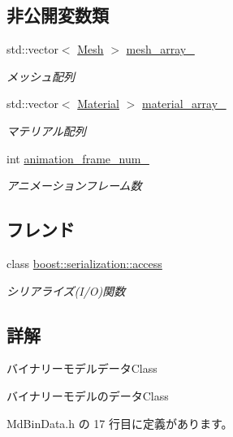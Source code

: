 \subsection*{非公開変数類}
\begin{DoxyCompactItemize}
\item 
std\+::vector$<$ \mbox{\hyperlink{class_md_bin_data_1_1_mesh}{Mesh}} $>$ \mbox{\hyperlink{class_md_bin_data_aefce3cdcd6dcdf388c936ade62c6b9fa}{mesh\+\_\+array\+\_\+}}
\begin{DoxyCompactList}\small\item\em メッシュ配列 \end{DoxyCompactList}\item 
std\+::vector$<$ \mbox{\hyperlink{class_md_bin_data_1_1_material}{Material}} $>$ \mbox{\hyperlink{class_md_bin_data_a2e418d4749d2154ca1c22cdb8ee99740}{material\+\_\+array\+\_\+}}
\begin{DoxyCompactList}\small\item\em マテリアル配列 \end{DoxyCompactList}\item 
int \mbox{\hyperlink{class_md_bin_data_a71825485140228ce2ae106cc1133be0a}{animation\+\_\+frame\+\_\+num\+\_\+}}
\begin{DoxyCompactList}\small\item\em アニメーションフレーム数 \end{DoxyCompactList}\end{DoxyCompactItemize}
\subsection*{フレンド}
\begin{DoxyCompactItemize}
\item 
class \mbox{\hyperlink{class_md_bin_data_ac98d07dd8f7b70e16ccb9a01abf56b9c}{boost\+::serialization\+::access}}
\begin{DoxyCompactList}\small\item\em シリアライズ(I/O)関数 \end{DoxyCompactList}\end{DoxyCompactItemize}


\subsection{詳解}
バイナリーモデルデータ\+Class 

バイナリーモデルのデータ\+Class 

 Md\+Bin\+Data.\+h の 17 行目に定義があります。



